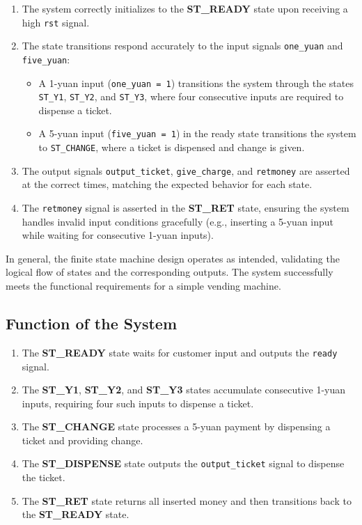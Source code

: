 \documentclass[]{article}
\begin{document}
\begin{enumerate}
    \item The system correctly initializes to the \textbf{ST\_READY} state upon receiving a high \texttt{rst} signal.
    \item The state transitions respond accurately to the input signals \texttt{one\_yuan} and \texttt{five\_yuan}:
          \begin{itemize}
              \item A 1-yuan input (\texttt{one\_yuan = 1}) transitions the system through the states \texttt{ST\_Y1}, \texttt{ST\_Y2}, and \texttt{ST\_Y3}, where four consecutive inputs are required to dispense a ticket.
              \item A 5-yuan input (\texttt{five\_yuan = 1}) in the ready state transitions the system to \texttt{ST\_CHANGE}, where a ticket is dispensed and change is given.
          \end{itemize}
    \item The output signals \texttt{output\_ticket}, \texttt{give\_charge}, and \texttt{retmoney} are asserted at the correct times, matching the expected behavior for each state.
    \item The \texttt{retmoney} signal is asserted in the \textbf{ST\_RET} state, ensuring the system handles invalid input conditions gracefully (e.g., inserting a 5-yuan input while waiting for consecutive 1-yuan inputs).
\end{enumerate}

\noindent In general, the finite state machine design operates as intended, validating the logical flow of states and the corresponding outputs. The system successfully meets the functional requirements for a simple vending machine.

\subsection{Function of the System}
\begin{enumerate}
    \item The \textbf{ST\_READY} state waits for customer input and outputs the \texttt{ready} signal.
    \item The \textbf{ST\_Y1}, \textbf{ST\_Y2}, and \textbf{ST\_Y3} states accumulate consecutive 1-yuan inputs, requiring four such inputs to dispense a ticket.
    \item The \textbf{ST\_CHANGE} state processes a 5-yuan payment by dispensing a ticket and providing change.
    \item The \textbf{ST\_DISPENSE} state outputs the \texttt{output\_ticket} signal to dispense the ticket.
    \item The \textbf{ST\_RET} state returns all inserted money and then transitions back to the \textbf{ST\_READY} state.
\end{enumerate}
\end{document}
